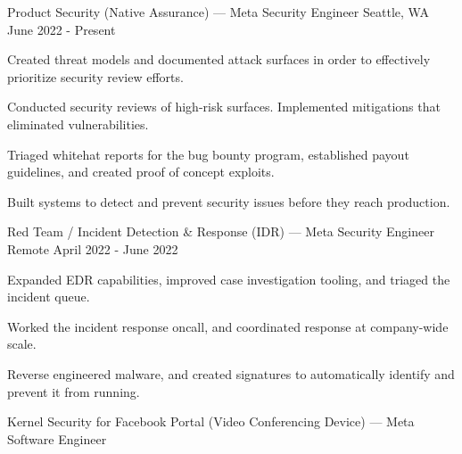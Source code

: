 
\begin{cventries}

\cventry
{Product Security (Native Assurance) — Meta} %
{Security Engineer} %
{Seattle, WA} %
{June 2022 - Present} %
{
	\begin{cvitems} %
		\item {Created threat models and documented attack surfaces in order to effectively prioritize security review efforts.}
		\item {Conducted security reviews of high-risk surfaces. Implemented mitigations that eliminated vulnerabilities.}
		\item {Triaged whitehat reports for the bug bounty program, established payout guidelines, and created proof of concept exploits.}
		\item {Built systems to detect and prevent security issues before they reach production.}
	\end{cvitems}
}
\cventry
{Red Team / Incident Detection \& Response (IDR) —  Meta} %
{Security Engineer} %
{Remote} %
{April 2022 - June 2022} %
{
	\begin{cvitems} %
		\item {Expanded EDR capabilities, improved case investigation tooling, and triaged the incident queue.}
		\item {Worked the incident response oncall, and coordinated response at company-wide scale.}
		\item {Reverse engineered malware, and created signatures to automatically identify and prevent it from running.}
	\end{cvitems}
}
\cventry
{Kernel Security for Facebook Portal (Video Conferencing Device) — Meta} %
{Software Engineer} %

\end{cventries}
